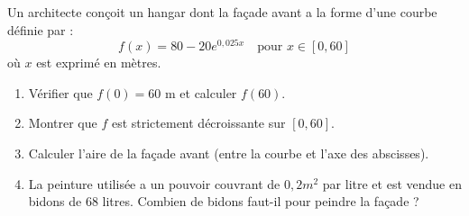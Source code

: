 \documentclass[../PolyS2.tex]{subfiles}
\begin{document}

Un architecte conçoit un hangar dont la façade avant a la forme d'une courbe définie par :
$$f(x) = 80 - 20e^{0{,}025x} \quad \text{pour } x \in [0, 60]$$
où $x$ est exprimé en mètres.

\begin{enumerate}
\item Vérifier que $f(0) = 60$ m et calculer $f(60)$.
\item Montrer que $f$ est strictement décroissante sur $[0, 60]$.
\item Calculer l'aire de la façade avant (entre la courbe et l'axe des abscisses).
\item La peinture utilisée a un pouvoir couvrant de  $0,2 m^2$ par litre et est vendue en bidons de 68 litres. Combien de bidons faut-il pour peindre la façade ?
\end{enumerate}
\end{document}
